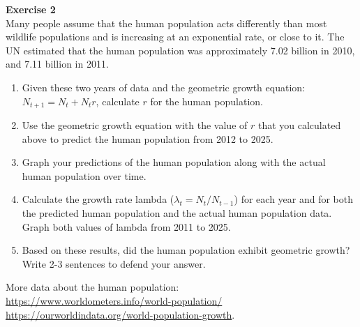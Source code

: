 \documentclass[12pt]{article}\usepackage[]{graphicx}\usepackage[]{xcolor}
\begin{document}





{\bf Exercise 2 \\}
Many people assume that the human population acts differently than
most wildlife populations and is increasing at an exponential rate, or
close to it. The UN estimated that the human population was
approximately 7.02 billion in 2010, and 7.11 billion in 2011.


\begin{enumerate}
  \item Given these two years of data and the geometric growth equation:
    $N_{t+1} = N_t + N_t r$, calculate $r$ for the human population. 
  \item Use the geometric growth equation with the value of $r$ that
    you calculated above to predict the human population from 2012 to
    2025. 
  \item Graph your predictions of the human population along with the
    actual human population over time.
  \item Calculate the growth rate lambda ($\lambda_t = N_t / N_{t-1}$)
    for each year and for both the predicted human population and the
    actual human population data. Graph both values of lambda from
    2011 to 2025.
  \item Based on these results, did the human population exhibit
    geometric growth? Write 2-3 sentences to defend your answer. 
\end{enumerate}

\vspace{24pt}

More data about the human population: \\
\url{https://www.worldometers.info/world-population/} \\
\url{https://ourworldindata.org/world-population-growth}.

\end{document}
